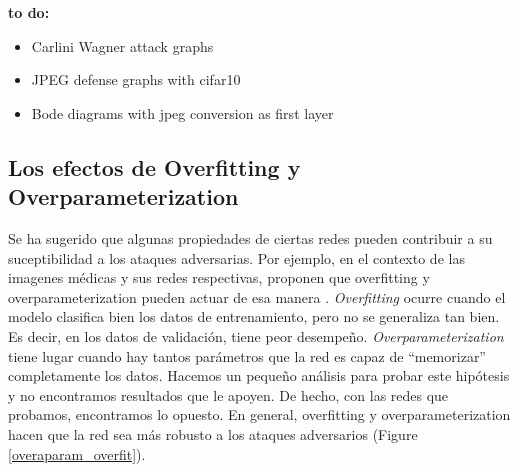 
{\LARGE \textbf{to do:}}
\begin{itemize}
    \item Carlini Wagner attack graphs
    \item JPEG defense graphs with cifar10
    \item Bode diagrams with jpeg conversion as first layer
    
    
\end{itemize}







\subsection{Los efectos de Overfitting y Overparameterization}

Se ha sugerido que algunas propiedades de ciertas redes pueden contribuir a su suceptibilidad a los ataques adversarias. Por ejemplo, en el contexto de las imagenes médicas y sus redes respectivas, proponen que overfitting y overparameterization pueden actuar de esa manera \cite{ma2020understanding}. \textit{Overfitting} ocurre cuando el modelo clasifica bien los datos de entrenamiento, pero no se generaliza tan bien. Es decir, en los datos de validación, tiene peor desempeño. \textit{Overparameterization} tiene lugar cuando hay tantos parámetros que la red es capaz de ``memorizar'' completamente los datos. Hacemos un pequeño análisis para probar este hipótesis y no encontramos resultados que le apoyen. De hecho, con las redes que probamos, encontramos lo opuesto. En general, overfitting y overparameterization hacen que la red sea más robusto a los ataques adversarios (Figure \ref{overaparam_overfit}).

